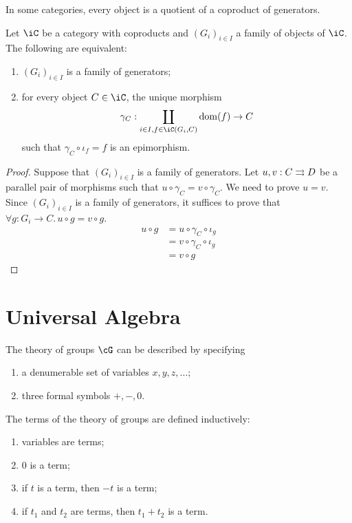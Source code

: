 \documentclass{amsart}
\begin{document}
In some categories, every object is a quotient of a coproduct of generators.
\begin{prop}
  Let $\iC$ be a category with coproducts and $(G_{i})_{i \in I}$ a family of objects of $\iC$.
  The following are equivalent:
  \begin{enumerate}
  \item $(G_{i})_{i \in I}$ is a family of generators;
  \item for every object $C \in \iC$, the unique morphism
    \[
      \gamma_{C} : \coprod_{i \in I, f \in \iC(G_{i}, C)} \dom(f) \to C
    \]
    such that $\gamma_{C} \circ \iota_{f} = f$ is an epimorphism.
  \end{enumerate}
\end{prop}
\begin{proof}
  Suppose that $(G_{i})_{i \in I}$ is a family of generators.
  Let $u,v : C \rightrightarrows D$ be a parallel pair of morphisms such that $u \circ \gamma_{C} = v \circ \gamma_{C}$.
  We need to prove $u = v$.
  Since $(G_{i})_{i \in I}$ is a family of generators, it suffices to prove that $\forall g : G_{i} \to C.\,u \circ g = v \circ g$.
  \begin{align}
    u \circ g &= u \circ \gamma_{C} \circ \iota_{g}\\
          &= v \circ \gamma_{C} \circ \iota_{g}\\
          &= v \circ g
  \end{align}
\end{proof}

\section{Universal Algebra}
\label{sec:universal-algebra}

The theory of groups $\cG$ can be described by specifying
\begin{enumerate}
\item a denumerable set of variables $x, y, z, \ldots$;
\item three formal symbols $+, -, 0$.
\end{enumerate}

The terms of the theory of groups are defined inductively:
\begin{enumerate}
\item variables are terms;
\item $0$ is a term;
\item if $t$ is a term, then $-t$ is a term;
\item if $t_{1}$ and $t_{2}$ are terms, then $t_{1} + t_{2}$ is a term.
\end{enumerate}
\end{document}
